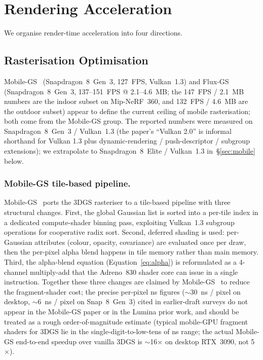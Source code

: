 
\section{Rendering Acceleration}
\label{sec:rendering}

We organise render-time acceleration into four directions.

\subsection{Rasterisation Optimisation}
Mobile-GS~\cite{du2026mobilegs} (Snapdragon~8~Gen~3, 127~FPS, Vulkan~1.3)
and Flux-GS~\cite{du2026fluxgs} (Snapdragon~8~Gen~3, 137--151~FPS @
2.1--4.6~MB; the 147~FPS / 2.1~MB numbers are the indoor subset
on Mip-NeRF~360, and 132~FPS / 4.6~MB are the outdoor subset) appear
to define the current ceiling of mobile rasterisation; both come
from the Mobile-GS group.
The reported numbers were measured on Snapdragon~8~Gen~3 / Vulkan~1.3
(the paper's ``Vulkan 2.0'' is informal shorthand for Vulkan 1.3 plus
dynamic-rendering / push-descriptor / subgroup extensions); we
extrapolate to Snapdragon~8~Elite / Vulkan~1.3 in~\S\ref{sec:mobile} below.

\subsubsection{Mobile-GS tile-based pipeline.}
Mobile-GS~\cite{du2026mobilegs} ports the 3DGS rasteriser to a
tile-based pipeline with three structural changes. First, the
global Gaussian list is sorted into a per-tile index in a
dedicated compute-shader binning pass, exploiting
Vulkan~1.3 subgroup operations for cooperative radix sort.
Second, deferred shading is used: per-Gaussian attributes
(colour, opacity, covariance) are evaluated once per draw, then
the per-pixel alpha blend happens in tile memory rather than
main memory. Third, the alpha-blend equation
(Equation~\eqref{eq:alpha}) is reformulated as a 4-channel
multiply-add that the Adreno~830 shader core can issue in a
single instruction. Together these three changes are claimed
by Mobile-GS~\cite{du2026mobilegs} to reduce the
fragment-shader cost; the precise per-pixel ns figures
($\sim$30~ns / pixel on desktop, $\sim$6~ns / pixel on
Snap~8~Gen~3) cited in earlier-draft surveys do not appear
in the Mobile-GS paper or in the Lumina prior work, and
should be treated as a rough order-of-magnitude estimate
(typical mobile-GPU fragment shaders for 3DGS lie in the
single-digit-to-low-tens of ns range; the actual Mobile-GS
end-to-end speedup over vanilla 3DGS is
$\sim$16$\times$ on desktop RTX~3090, not 5$\times$).

